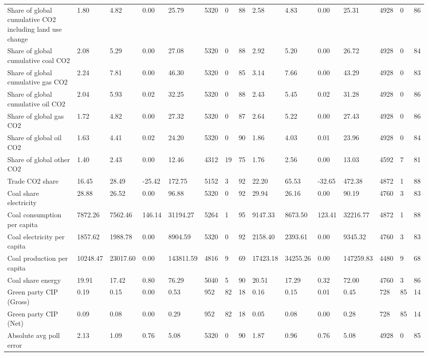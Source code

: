 \begin{longtable}{lllllllllllllll}
Share of global cumulative CO2 including land use change & 1.80 & 4.82 & 0.00 & 25.79 & 5320 & 0 & 88 & 2.58 & 4.83 & 0.00 & 25.31 & 4928 & 0 & 86\\
Share of global cumulative coal CO2 & 2.08 & 5.29 & 0.00 & 27.08 & 5320 & 0 & 88 & 2.92 & 5.20 & 0.00 & 26.72 & 4928 & 0 & 84\\
Share of global cumulative gas CO2 & 2.24 & 7.81 & 0.00 & 46.30 & 5320 & 0 & 85 & 3.14 & 7.66 & 0.00 & 43.29 & 4928 & 0 & 83\\
Share of global cumulative oil CO2 & 2.04 & 5.93 & 0.02 & 32.25 & 5320 & 0 & 88 & 2.43 & 5.45 & 0.02 & 31.28 & 4928 & 0 & 86\\
\addlinespace
Share of global gas CO2 & 1.72 & 4.82 & 0.00 & 27.32 & 5320 & 0 & 87 & 2.64 & 5.22 & 0.00 & 27.43 & 4928 & 0 & 86\\
Share of global oil CO2 & 1.63 & 4.41 & 0.02 & 24.20 & 5320 & 0 & 90 & 1.86 & 4.03 & 0.01 & 23.96 & 4928 & 0 & 84\\
Share of global other CO2 & 1.40 & 2.43 & 0.00 & 12.46 & 4312 & 19 & 75 & 1.76 & 2.56 & 0.00 & 13.03 & 4592 & 7 & 81\\
Trade CO2 share & 16.45 & 28.49 & -25.42 & 172.75 & 5152 & 3 & 92 & 22.20 & 65.53 & -32.65 & 472.38 & 4872 & 1 & 88\\
Coal share electricity & 28.88 & 26.52 & 0.00 & 96.88 & 5320 & 0 & 92 & 29.94 & 26.16 & 0.00 & 90.19 & 4760 & 3 & 83\\
\addlinespace
Coal consumption per capita & 7872.26 & 7562.46 & 146.14 & 31194.27 & 5264 & 1 & 95 & 9147.33 & 8673.50 & 123.41 & 32216.77 & 4872 & 1 & 88\\
Coal electricity per capita & 1857.62 & 1988.78 & 0.00 & 8904.59 & 5320 & 0 & 92 & 2158.40 & 2393.61 & 0.00 & 9345.32 & 4760 & 3 & 83\\
Coal production per capita & 10248.47 & 23017.60 & 0.00 & 143811.59 & 4816 & 9 & 69 & 17423.18 & 34255.26 & 0.00 & 147259.83 & 4480 & 9 & 68\\
Coal share energy & 19.91 & 17.42 & 0.80 & 76.29 & 5040 & 5 & 90 & 20.51 & 17.29 & 0.32 & 72.00 & 4760 & 3 & 86\\
Green party CIP (Gross) & 0.19 & 0.15 & 0.00 & 0.53 & 952 & 82 & 18 & 0.16 & 0.15 & 0.01 & 0.45 & 728 & 85 & 14\\
\addlinespace
Green party CIP (Net) & 0.09 & 0.08 & 0.00 & 0.29 & 952 & 82 & 18 & 0.05 & 0.08 & 0.00 & 0.28 & 728 & 85 & 14\\
Absolute avg poll error & 2.13 & 1.09 & 0.76 & 5.08 & 5320 & 0 & 90 & 1.87 & 0.96 & 0.76 & 5.08 & 4928 & 0 & 85\\

\end{longtable}
